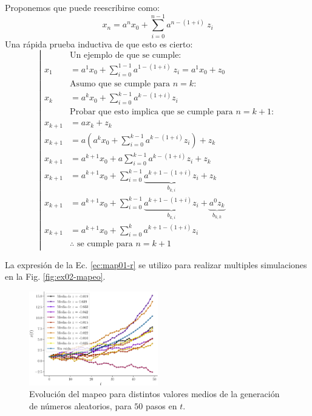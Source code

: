 \documentclass[twocolumn,aps,prl]{revtex4-1}
\newcommand{\Nsteps}{50}
\begin{document}
Proponemos que puede reescribirse como:
\begin{equation}\label{ec:map01-r}
  x_n = a^{n} x_0 + \sum_{i=0}^{n-1} a^{n-(1+i)} \ z_i
\end{equation}
Una rápida prueba inductiva de que esto es cierto:
$$
\left|
\begin{aligned}
  & \text{Un ejemplo de que se cumple:} \\
  x_1 &= a^{1} x_0 + \sum_{i=0}^{1-1} a^{1-(1+i)} \ z_i = a^{1} x_0 +z_0\\
  & \text{Asumo que se cumple para $n=k$:} \\
  x_k &= a^{k} x_0 + \sum_{i=0}^{k-1} a^{k-(1+i)} z_i\\
  & \text{Probar que esto implica que se cumple para $n=k+1$:} \\
  x_{k+1} &= a x_k + z_k \\
  x_{k+1} &= a (a^{k} x_0 + \sum_{i=0}^{k-1} a^{k-(1+i)} z_i) + z_k \\
  x_{k+1} &= a^{k+1} x_0 + a\sum_{i=0}^{k-1} a^{k-(1+i)} z_i + z_k \\
  x_{k+1} &= a^{k+1} x_0 + \sum_{i=0}^{k-1} \underbrace{a^{k+1-(1+i)} z_i}_{b_{k,i}} + z_k \\
  x_{k+1} &= a^{k+1} x_0 + \sum_{i=0}^{k-1} \underbrace{a^{k+1-(1+i)} z_i}_{b_{k,i}} + \underbrace{a^0 z_k}_{b_{k,k}} \\
  x_{k+1} &= a^{k+1} x_0 + \sum_{i=0}^{k} a^{k+1-(1+i)} z_i \\
  & \text{$\therefore$ se cumple para $n=k+1$}
\end{aligned}
\right.
$$

La expresión de la Ec. \ref{ec:map01-r} se utilizo para realizar multiples simulaciones en la Fig. \ref{fig:ex02-mapeo}.

\begin{figure}  
  \centering  
  \includegraphics[width=0.5\textwidth]{figuras/ex02-mapeo.pdf}
  \caption{Evolución del mapeo para distintos valores medios de la generación de números aleatorios, para $\Nsteps$ pasos en $t$.}
  \label{fig:ultima_iteracion}
\end{figure}
\end{document}
